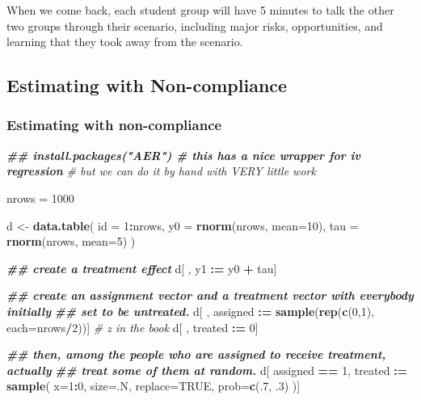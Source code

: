 \documentclass[
]{article}
\newenvironment{Shaded}{\begin{snugshade}}{\end{snugshade}}
\newcommand{\AttributeTok}[1]{\textcolor[rgb]{0.13,0.29,0.53}{#1}}
\newcommand{\CommentTok}[1]{\textcolor[rgb]{0.56,0.35,0.01}{\textit{#1}}}
\newcommand{\ConstantTok}[1]{\textcolor[rgb]{0.56,0.35,0.01}{#1}}
\newcommand{\DecValTok}[1]{\textcolor[rgb]{0.00,0.00,0.81}{#1}}
\newcommand{\DocumentationTok}[1]{\textcolor[rgb]{0.56,0.35,0.01}{\textbf{\textit{#1}}}}
\newcommand{\FunctionTok}[1]{\textcolor[rgb]{0.13,0.29,0.53}{\textbf{#1}}}
\newcommand{\NormalTok}[1]{#1}
\newcommand{\OtherTok}[1]{\textcolor[rgb]{0.56,0.35,0.01}{#1}}
\newcommand{\SpecialCharTok}[1]{\textcolor[rgb]{0.81,0.36,0.00}{\textbf{#1}}}
\theoremstyle{definition}
\theoremstyle{definition}
\theoremstyle{definition}
\theoremstyle{definition}
\theoremstyle{remark}
\begin{document}
When we come back, each student group will have 5 minutes to talk the other two groups through their scenario, including major risks, opportunities, and learning that they took away from the scenario.

\subsection{Estimating with Non-compliance}\label{estimating-with-non-compliance}

\subsubsection{Estimating with non-compliance}\label{estimating-with-non-compliance-1}

\begin{Shaded}
\begin{Highlighting}[]
\DocumentationTok{\#\# install.packages("AER")      \# this has a nice wrapper for iv regression}
                                \CommentTok{\# but we can do it by hand with VERY little work }

\NormalTok{nrows }\OtherTok{=} \DecValTok{1000}

\NormalTok{d }\OtherTok{\textless{}{-}} \FunctionTok{data.table}\NormalTok{(}
  \AttributeTok{id  =} \DecValTok{1}\SpecialCharTok{:}\NormalTok{nrows, }
  \AttributeTok{y0  =} \FunctionTok{rnorm}\NormalTok{(nrows, }\AttributeTok{mean=}\DecValTok{10}\NormalTok{), }
  \AttributeTok{tau =} \FunctionTok{rnorm}\NormalTok{(nrows, }\AttributeTok{mean=}\DecValTok{5}\NormalTok{)}
\NormalTok{)}

\DocumentationTok{\#\# create a treatment effect}
\NormalTok{d[ , y1 }\SpecialCharTok{:=}\NormalTok{ y0 }\SpecialCharTok{+}\NormalTok{ tau]}

\DocumentationTok{\#\# create an assignment vector and a treatment vector with everybody initially}
\DocumentationTok{\#\# set to be untreated. }
\NormalTok{d[ , assigned }\SpecialCharTok{:=} \FunctionTok{sample}\NormalTok{(}\FunctionTok{rep}\NormalTok{(}\FunctionTok{c}\NormalTok{(}\DecValTok{0}\NormalTok{,}\DecValTok{1}\NormalTok{), }\AttributeTok{each=}\NormalTok{nrows}\SpecialCharTok{/}\DecValTok{2}\NormalTok{))] }\CommentTok{\# z in the book}
\NormalTok{d[ , treated }\SpecialCharTok{:=} \DecValTok{0}\NormalTok{] }

\DocumentationTok{\#\# then, among the people who are assigned to receive treatment, actually }
\DocumentationTok{\#\# treat some of them at random. }
\NormalTok{d[}
\NormalTok{  assigned }\SpecialCharTok{==} \DecValTok{1}\NormalTok{, }
\NormalTok{  treated  }\SpecialCharTok{:=} \FunctionTok{sample}\NormalTok{(}
    \AttributeTok{x=}\DecValTok{1}\SpecialCharTok{:}\DecValTok{0}\NormalTok{, }\AttributeTok{size=}\NormalTok{.N, }\AttributeTok{replace=}\ConstantTok{TRUE}\NormalTok{, }\AttributeTok{prob=}\FunctionTok{c}\NormalTok{(.}\DecValTok{7}\NormalTok{, .}\DecValTok{3}\NormalTok{)}
\NormalTok{    )]}


\end{Highlighting}
\end{Shaded}
\end{document}
